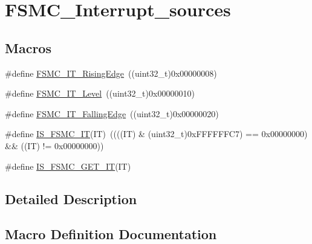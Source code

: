 \hypertarget{group___f_s_m_c___interrupt__sources}{}\section{F\+S\+M\+C\+\_\+\+Interrupt\+\_\+sources}
\label{group___f_s_m_c___interrupt__sources}
\subsection*{Macros}
\begin{DoxyCompactItemize}
\item 
\#define \mbox{\hyperlink{group___f_s_m_c___interrupt__sources_gac483854bd6f90d8c7899a597a0c0ab1a}{F\+S\+M\+C\+\_\+\+I\+T\+\_\+\+Rising\+Edge}}~((uint32\+\_\+t)0x00000008)
\item 
\#define \mbox{\hyperlink{group___f_s_m_c___interrupt__sources_ga59b5839854074008fb36fa86ec50a0c7}{F\+S\+M\+C\+\_\+\+I\+T\+\_\+\+Level}}~((uint32\+\_\+t)0x00000010)
\item 
\#define \mbox{\hyperlink{group___f_s_m_c___interrupt__sources_ga8e4b9589c9981c900b5f2e84581a9693}{F\+S\+M\+C\+\_\+\+I\+T\+\_\+\+Falling\+Edge}}~((uint32\+\_\+t)0x00000020)
\item 
\#define \mbox{\hyperlink{group___f_s_m_c___interrupt__sources_ga40a38f097a75f27a700e626905fa9a38}{I\+S\+\_\+\+F\+S\+M\+C\+\_\+\+IT}}(IT)~((((IT) \& (uint32\+\_\+t)0x\+F\+F\+F\+F\+F\+F\+C7) == 0x00000000) \&\& ((\+I\+T) != 0x00000000))
\item 
\#define \mbox{\hyperlink{group___f_s_m_c___interrupt__sources_gae2a57d0b15e025212489ec1421ff245d}{I\+S\+\_\+\+F\+S\+M\+C\+\_\+\+G\+E\+T\+\_\+\+IT}}(IT)
\end{DoxyCompactItemize}


\subsection{Detailed Description}


\subsection{Macro Definition Documentation}
\mbox{\label{group___f_s_m_c___interrupt__sources_ga8e4b9589c9981c900b5f2e84581a9693}} 
